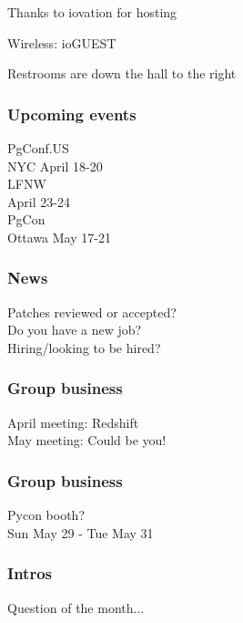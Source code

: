 \documentclass{beamer}
\begin{document}

\frame
{
  \begin{center}
  \item[]Thanks to iovation for hosting
  \item[]Wireless: ioGUEST
  \item[]Restrooms are down the hall to the right
  \end{center}
}

\frame
{
  \frametitle{Upcoming events}
  \begin{center}
{\large PgConf.US\\}
NYC April 18-20\\
\vspace{5mm}
{\large LFNW\\} April 23-24\\
\vspace{5mm}
{\large PgCon\\}
Ottawa May 17-21\\
  \end{center}
}

\frame
{
  \frametitle{News}
  \begin{center}
Patches reviewed or accepted?\\
Do you have a new job?\\
Hiring/looking to be hired?\\
  \end{center}
}

\frame
{
  \frametitle{Group business}
  \begin{center}
April meeting: Redshift\\
\vspace{5mm}
May meeting:  Could be you!\\
  \end{center}
}

\frame
{
  \frametitle{Group business}
  \begin{center}
Pycon booth?\\
\vspace{5mm}
Sun May 29 - Tue May 31\\
  \end{center}
}


\frame
{
  \frametitle{Intros}
  \begin{center}
Question of the month...\\
  \end{center}
}
\end{document}
